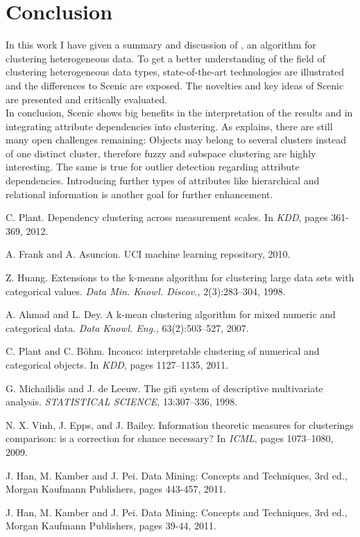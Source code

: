 \documentclass[conference]{IEEEtran}
\begin{document}
\section{Conclusion}
In this work I have given a summary and discussion of \cite{scenic}, an algorithm for clustering heterogeneous data.
To get a better understanding of the field of clustering heterogeneous data types, state-of-the-art technologies are illustrated and the differences to Scenic are exposed. The novelties and key ideas of Scenic are presented and critically evaluated.
\\
In conclusion, Scenic shows big benefits in the interpretation of the results and in integrating attribute dependencies into clustering. As \cite{scenic} explains, there are still many open challenges remaining: Objects may belong to several clusters instead of one distinct cluster, therefore fuzzy and subspace clustering are highly interesting. The same is true for outlier detection regarding attribute dependencies. Introducing further types of attributes like hierarchical and relational information is another goal for further enhancement.



\begin{thebibliography}{20}
C. Plant. Dependency clustering across measurement scales. In \textit{KDD}, pages 361-369, 2012.

 A. Frank and A. Asuncion. UCI machine learning repository, 2010.

Z. Huang. Extensions to the k-means algorithm for clustering large data sets with categorical values. \textit{Data Min. Knowl. Discov.,} 2(3):283–304, 1998.

A. Ahmad and L. Dey. A k-mean clustering algorithm for mixed numeric and categorical data. \textit{Data Knowl. Eng.,} 63(2):503–527, 2007.

C. Plant and C. Böhm. Inconco: interpretable clustering of numerical and categorical objects. In \textit{KDD}, pages 1127–1135, 2011.

G. Michailidis and J. de Leeuw. The gifi system of descriptive multivariate analysis. \textit{STATISTICAL SCIENCE}, 13:307–336, 1998.

N. X. Vinh, J. Epps, and J. Bailey. Information theoretic measures for clusterings comparison: is a correction for chance necessary? In \textit{ICML}, pages 1073–1080, 2009.

J. Han, M. Kamber and J. Pei. Data Mining: Concepts and Techniques, 3rd ed., Morgan Kaufmann Publishers, pages 443-457, 2011.

J. Han, M. Kamber and J. Pei. Data Mining: Concepts and Techniques, 3rd ed., Morgan Kaufmann Publishers, pages 39-44, 2011.
\end{thebibliography}
\end{document}
